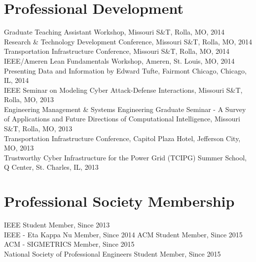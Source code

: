 \documentclass[10pt]{article}
\newlength{\Vspace}
\newlength{\Vspace}
\begin{document}
\ifResume
\else
\section{Professional Development}
\begin{flushleft}
Graduate Teaching Assistant Workshop, Missouri S\&T, Rolla, MO, 2014 \vspace{\Vspace} \\
Research \& Technology Development Conference, Missouri S\&T, Rolla, MO, 2014 \vspace{\Vspace} \\
Transportation Infrastructure Conference, Missouri S\&T, Rolla, MO, 2014 \vspace{\Vspace} \\
IEEE/Ameren Lean Fundamentals Workshop, Ameren, St. Louis, MO, 2014 \vspace{\Vspace} \\
Presenting Data and Information by Edward Tufte, Fairmont Chicago, Chicago, IL, 2014 \vspace{\Vspace} \\
IEEE Seminar on Modeling Cyber Attack-Defense Interactions, Missouri S\&T, Rolla, MO, 2013 \vspace{\Vspace} \\
Engineering Management \& Systems Engineering Graduate Seminar - A Survey of Applications and Future Directions of Computational Intelligence, Missouri S\&T, Rolla, MO, 2013 \vspace{\Vspace} \\
Transportation Infrastructure Conference, Capitol Plaza Hotel, Jefferson City, MO, 2013 \vspace{\Vspace} \\
Trustworthy Cyber Infrastructure for the Power Grid (TCIPG) Summer School, Q Center, St. Charles, IL, 2013
\end{flushleft}
\fi

\ifResume
\else
\section{Professional Society Membership}
\begin{flushleft}
IEEE Student Member, Since 2013 \vspace{\Vspace} \\
IEEE - Eta Kappa Nu Member, Since 2014
ACM Student Member, Since 2015 \vspace{\Vspace} \\
ACM - SIGMETRICS Member, Since 2015 \vspace{\Vspace} \\
National Society of Professional Engineers Student Member, Since 2015
\end{flushleft}
\fi
\end{document}
